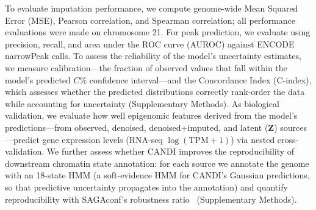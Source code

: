 To evaluate imputation performance, we compute genome-wide Mean Squared Error (MSE), Pearson correlation, and Spearman correlation; all performance evaluations were made on chromosome 21. For peak prediction, we evaluate using precision, recall, and area under the ROC curve (AUROC) against ENCODE narrowPeak calls. To assess the reliability of the model's uncertainty estimates, we measure calibration---the fraction of observed values that fall within the model's predicted $C\%$ confidence interval---and the Concordance Index (C-index), which assesses whether the predicted distributions correctly rank-order the data while accounting for uncertainty (Supplementary Methods). As biological validation, we evaluate how well epigenomic features derived from the model's predictions---from observed, denoised, denoised+imputed, and latent ($\mathbf{Z}$) sources---predict gene expression levels (RNA-seq $\log(\text{TPM}+1)$) via nested cross-validation. We further assess whether CANDI improves the reproducibility of downstream chromatin state annotation: for each source we annotate the genome with an 18-state HMM (a soft-evidence HMM for CANDI's Gaussian predictions, so that predictive uncertainty propagates into the annotation) and quantify reproducibility with SAGAconf's robustness ratio~\cite{shahraki2024robust} (Supplementary Methods).
